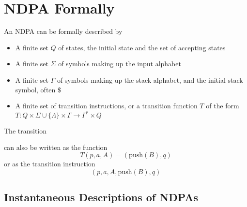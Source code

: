 \section*{NDPA Formally}

\begin{definition*}{}{}
  An NDPA can be formally described by
  \begin{itemize}
    \item A finite set $Q$ of states, the initial state and the set of accepting states
    \item A finite set $\Sigma$ of symbols making up the input alphabet
    \item A finite set $\Gamma$ of symbols making up the stack alphabet, and the initial stack symbol, often $\$$
    \item A finite set of transition instructions, or a transition function $T$ of the form 
     $T : Q \times \Sigma \cup \{\Lambda\} \times \Gamma \rightarrow \Gamma^* \times Q$
  \end{itemize}
\end{definition*}

\begin{example*}{}{}
  The transition
  \begin{center}
  \end{center}
  can also be written as the function
  \begin{equation*}
    T(p, a, A) = (\mathrm{push}(B), q)
  \end{equation*}
  or as the transition instruction
  \begin{equation*}
    (p, a, A, \mathrm{push}(B), q)
  \end{equation*}
\end{example*}

\subsection*{Instantaneous Descriptions of NDPAs}

